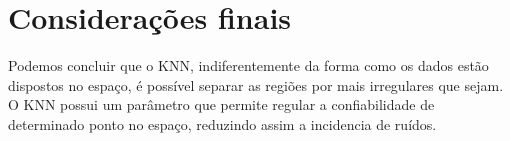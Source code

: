 \documentclass[
	article,			%
	11pt,				%
	oneside,			%
	a4paper,			%
	english,			%
	brazil,				%
	]{abntex2}
\begin{document}
 
 
 
% 

\section*{Considerações finais}
Podemos concluir que o KNN,  indiferentemente da forma como os dados estão
dispostos no espaço, é possível separar as regiões por mais irregulares que
sejam. O KNN possui um parâmetro que permite regular a confiabilidade de
determinado ponto no espaço, reduzindo assim a incidencia de ruídos.






\postextual



%
% 

\end{document}
